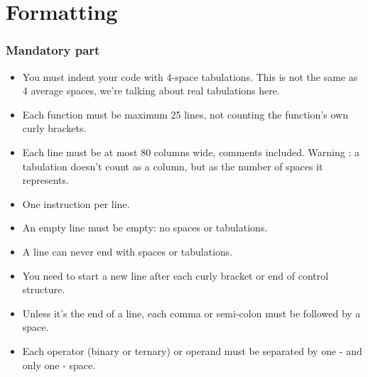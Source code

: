 \documentclass{42-en}
\begin{document}
    \section{Formatting}

        \subsubsection{Mandatory part}

            \begin{itemize}

    		        \item You must indent your code with 4-space
                  tabulations. This is not the same as 4 average
                  spaces, we're talking about real tabulations here.

                \item Each function must be maximum 25 lines, not
                  counting the function's own curly brackets.

                \item Each line must be at most 80 columns wide, comments
                  included. Warning : a tabulation doesn't count
                  as a column, but as the number of spaces it
                  represents.

                \item One instruction per line.

          		\item An empty line must be empty: no spaces or tabulations.

      			\item A line can never end with spaces or tabulations.

      			\item You need to start a new line after each curly bracket
                  or end of control structure.

      			\item Unless it's the end of a line, each comma or semi-colon
                  must be followed by a space.

      			\item Each operator (binary or ternary) or operand must be
                  separated by one - and only one - space.


\end{itemize}
\end{document}
